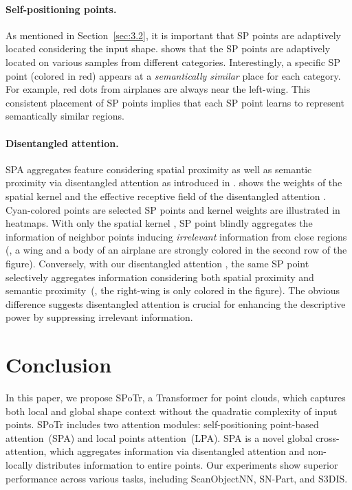 \documentclass[10pt,twocolumn,letterpaper]{article}
\begin{document}
\paragraph{Self-positioning points.}
As mentioned in Section~\ref{sec:3.2}, it is important that SP points are adaptively located considering the input shape.
 shows that the SP points are adaptively located on various samples from different categories.
Interestingly, a specific SP point (colored in red) appears at a \textit{semantically similar} place for each category.
For example, red dots from airplanes are always near the left-wing.
This consistent placement of SP points implies that each SP point learns to represent semantically similar regions.

\paragraph{Disentangled attention.}
SPA aggregates feature considering spatial proximity as well as semantic proximity via disentangled attention as introduced in . 
 shows the weights of the spatial kernel  and the effective receptive field of the disentangled attention .
Cyan-colored points are selected SP points and kernel weights are illustrated in heatmaps.
With only the spatial kernel , SP point blindly aggregates the information of neighbor points inducing \textit{irrelevant} information from close regions (\eg, a wing and a body of an airplane are strongly colored in the second row of the figure).
Conversely, with our disentangled attention , the same SP point selectively aggregates information considering both spatial proximity and semantic proximity~(\eg, the right-wing is only colored in the figure).
The obvious difference suggests disentangled attention is crucial for enhancing the descriptive power by suppressing irrelevant information.












 \section{Conclusion}
    \label{sec:5}
In this paper, we propose SPoTr, a Transformer for point clouds, which captures both local and global shape context without the quadratic complexity of input points.
SPoTr includes two attention modules: self-positioning point-based attention~(SPA) and local points attention~(LPA).
SPA is a novel global cross-attention, which aggregates information via disentangled attention and non-locally distributes information to entire points.
Our experiments show superior performance across various tasks, including ScanObjectNN, SN-Part, and S3DIS.
\end{document}
